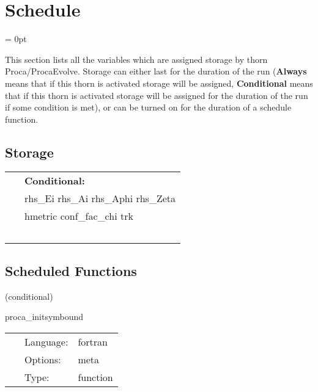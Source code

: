 
\section{Schedule} 


\parskip = 0pt


\noindent This section lists all the variables which are assigned storage by thorn Proca/ProcaEvolve.  Storage can either last for the duration of the run ({\bf Always} means that if this thorn is activated storage will be assigned, {\bf Conditional} means that if this thorn is activated storage will be assigned for the duration of the run if some condition is met), or can be turned on for the duration of a schedule function.


\subsection*{Storage}

\hspace{5mm}

 \begin{tabular*}{160mm}{ll} 
~& {\bf Conditional:} \\ 
~ &  rhs\_Ei rhs\_Ai rhs\_Aphi rhs\_Zeta\\ 
~ &  hmetric conf\_fac\_chi trk\\ 
~ & ~\\ 
\end{tabular*} 


\subsection*{Scheduled Functions}
\vspace{5mm}

   (conditional) 

\hspace{5mm} proca\_initsymbound 

\hspace{5mm}{\it schedule symmetries } 


\hspace{5mm}

 \begin{tabular*}{160mm}{cll} 
~ & Language:  & fortran \\ 
~ & Options:  & meta \\ 
~ & Type:  & function \\ 
\end{tabular*} 


\vspace{5mm}

